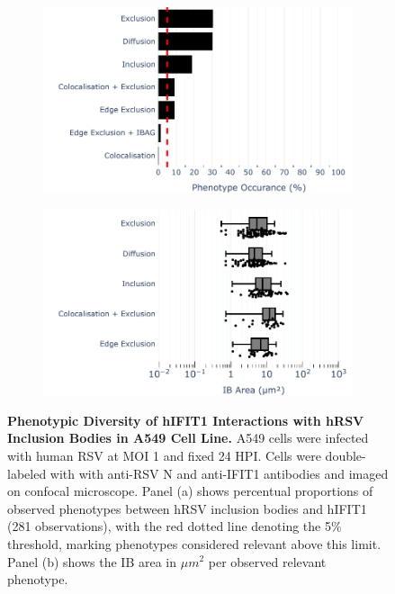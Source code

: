\lipsum[1-30]
\begin{figure}
    \begin{subfigure}{0.495\textwidth}
        \caption{}
        \includegraphics[width=1\linewidth]{08. Chapter 3/Figs/02. Infection/01. IFIT1/01. bar_i1_a549.pdf} 
    \end{subfigure}
    \begin{subfigure}{0.495\textwidth}
        \caption{}
        \includegraphics[width=1\linewidth]{08. Chapter 3/Figs/02. Infection/01. IFIT1/02. box_i1_a549.pdf}
    \end{subfigure}
    \caption[Phenotypic Diversity of hIFIT1 Interactions with hRSV Inclusion Bodies in A549 Cell Line.]{\textbf{Phenotypic Diversity of hIFIT1 Interactions with hRSV Inclusion Bodies in A549 Cell Line.} A549 cells were infected with human RSV at MOI 1 and fixed 24 HPI. Cells were double-labeled with with anti-RSV N and anti-IFIT1 antibodies and imaged on confocal microscope. Panel (a) shows percentual proportions of observed phenotypes between hRSV inclusion bodies and hIFIT1 (281 observations), with the red dotted line denoting the 5\% threshold, marking phenotypes considered relevant above this limit. Panel (b) shows the IB area in \(\mu m^2\) per observed relevant phenotype.}
    \label{fig:Phenotypic Diversity of hIFIT1 Interactions with hRSV Inclusion Bodies in A549 Cell Line}
\end{figure}

